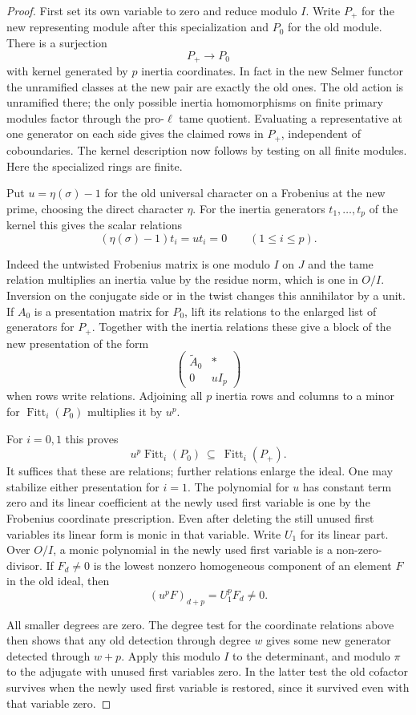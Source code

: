 \begin{proof}
First set its own variable to zero and reduce modulo \(I\).
Write \(P_+\) for the new representing module after this
specialization and \(P_0\) for the old module. There is a
surjection
\[
 P_+\to P_0
\]
with kernel generated by \(p\)
inertia coordinates. In fact in the new Selmer functor the
unramified classes at the new pair are exactly the old ones.
The old action is unramified there; the only possible
inertia homomorphisms on finite primary modules factor through
the pro-\(\ell\) tame quotient. Evaluating a representative at
one generator on each side gives the claimed rows in \(P_+\),
independent of coboundaries. The kernel description now follows
by testing on all finite modules. Here the specialized rings
are finite.

Put \(u=\eta(\sigma)-1\) for the old universal character on
a Frobenius at the new prime, choosing the direct character
\(\eta\). For the inertia generators \(t_1,\ldots,t_p\) of the kernel this gives the scalar relations
\[
 (\eta(\sigma)-1)t_i=u t_i=0\qquad(1\le i\le p).
\]

Indeed the untwisted Frobenius matrix is one modulo \(I\) on
\(J\) and the tame relation multiplies an inertia value by
the residue norm, which is one in \(O/I\). Inversion on the
conjugate side or in the twist changes this annihilator by
a unit. If \(A_0\) is a presentation matrix for \(P_0\), lift its
relations to the enlarged list of generators for \(P_+\).
Together with the inertia relations these give a block of the
new presentation of the form
\[
        \begin{pmatrix} \widetilde A_0 & *\\ 0 & u I_p\end{pmatrix}
\]
when rows write relations. Adjoining all \(p\) inertia rows
and columns to a minor for \(\operatorname{Fitt}_i(P_0)\)
multiplies it by \(u^p\).

For \(i=0,1\) this proves
\[
        u^p\operatorname{Fitt}_i(P_0)
                \ \subseteq\ \operatorname{Fitt}_i(P_+).
\]
It suffices that these are relations; further relations enlarge
the ideal. One may stabilize either presentation for \(i=1\).
The polynomial for \(u\) has constant term zero and its
linear coefficient at the newly used first variable is one
by the Frobenius coordinate prescription. Even after deleting
the still unused first variables its linear form is monic in
that variable. Write \(U_1\) for its linear part. Over \(O/I\), a monic
polynomial in the newly used first variable is a non-zero-divisor.
If \(F_d\ne0\) is the lowest nonzero homogeneous component of an
element \(F\) in the old ideal, then
\[
 (u^pF)_{d+p}=U_1^p F_d\ne0.
\]

All smaller degrees are zero. The degree test for the coordinate
relations above then shows that any old detection through
degree \(w\) gives some new generator detected through
\(w+p\). Apply this modulo \(I\) to the determinant, and
modulo \(\pi\) to the adjugate with unused first variables
zero. In the latter test the old cofactor survives when the
newly used first variable is restored, since it survived even
with that variable zero.

\end{proof}
